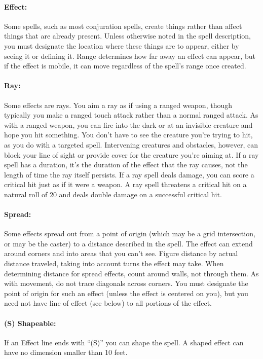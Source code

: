 \documentclass[../VancianToPsionics.tex]{subfiles}
\begin{document}
\paragraph{Effect:} Some spells, such as most conjuration spells, create things rather than affect things that are already present. 
Unless otherwise noted in the spell description, you must designate the location where these things are to appear, either by seeing it or defining it. Range determines how far away an effect can appear, but if the effect is mobile, it can move regardless of the spell's range once created.

\paragraph{Ray:} Some effects are rays. You aim a ray as if using a ranged weapon, though typically you make a ranged touch attack rather than a normal ranged attack. 
As with a ranged weapon, you can fire into the dark or at an invisible creature and hope you hit something. 
You don't have to see the creature you're trying to hit, as you do with a targeted spell. 
Intervening creatures and obstacles, however, can block your line of sight or provide cover for the creature you're aiming at.
If a ray spell has a duration, it's the duration of the effect that the ray causes, not the length of time the ray itself persists.
If a ray spell deals damage, you can score a critical hit just as if it were a weapon. 
A ray spell threatens a critical hit on a natural roll of 20 and deals double damage on a successful critical hit.

\paragraph{Spread:} Some effects spread out from a point of origin (which may be a grid intersection, or may be the caster) to a distance described in the spell. The effect can extend around corners and into areas that you can't see. 
Figure distance by actual distance traveled, taking into account turns the effect may take. 
When determining distance for spread effects, count around walls, not through them. 
As with movement, do not trace diagonals across corners. 
You must designate the point of origin for such an effect (unless the effect is centered on you), but you need not have line of effect (see below) to all portions of the effect.

\paragraph{(S) Shapeable:} If an Effect line ends with ``(S)'' you can shape the spell. 
A shaped effect can have no dimension smaller than 10 feet.
\end{document}

